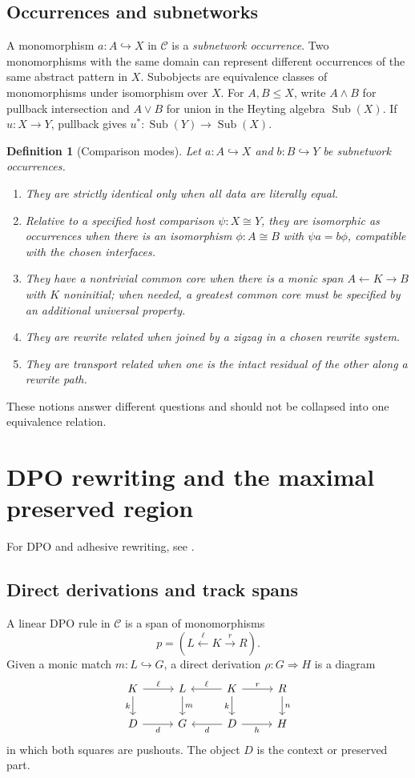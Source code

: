 \documentclass[12pt,a4paper,twoside]{extarticle}
\theoremstyle{compactplain}
\theoremstyle{compactdef}
\newtheorem{definition}[theorem]{Definition}
\newcommand{\Sub}{\operatorname{Sub}}
\newcommand{\iso}{\cong}
\newcommand{\mono}{\hookrightarrow}
\begin{document}
\subsection{Occurrences and subnetworks}
A monomorphism $a:A\mono X$ in $\mathcal C$ is a \emph{subnetwork occurrence}. Two monomorphisms with the same domain can represent different occurrences of the same abstract pattern in $X$. Subobjects are equivalence classes of monomorphisms under isomorphism over $X$. For $A,B\le X$, write $A\wedge B$ for pullback intersection and $A\vee B$ for union in the Heyting algebra $\Sub(X)$. If $u:X\to Y$, pullback gives $u^*:\Sub(Y)\to\Sub(X)$.

\begin{definition}[Comparison modes]
Let $a:A\mono X$ and $b:B\mono Y$ be subnetwork occurrences.
\begin{enumerate}
\item They are strictly identical only when all data are literally equal.
\item Relative to a specified host comparison $\psi:X\iso Y$, they are isomorphic as occurrences when there is an isomorphism $\phi:A\iso B$ with $\psi a=b\phi$, compatible with the chosen interfaces.
\item They have a nontrivial common core when there is a monic span $A\leftarrow K\rightarrow B$ with $K$ noninitial; when needed, a greatest common core must be specified by an additional universal property.
\item They are rewrite related when joined by a zigzag in a chosen rewrite system.
\item They are transport related when one is the intact residual of the other along a rewrite path.
\end{enumerate}
\end{definition}
These notions answer different questions and should not be collapsed into one equivalence relation.
\section{DPO rewriting and the maximal preserved region}
For DPO and adhesive rewriting, see \cite{lack-sobocinski,behr-harmer-krivine,zanasi-free-hypergraph,bonchi-rewriting-frobenius}.

\subsection{Direct derivations and track spans}
A linear DPO rule in $\mathcal C$ is a span of monomorphisms
\[
p=(L\xleftarrow{\ell}K\xrightarrow{r}R).
\]
Given a monic match $m:L\mono G$, a direct derivation $\rho:G\Rightarrow H$ is a diagram
\[
\begin{tikzcd}[column sep=2.7em,row sep=1.7em]
K \arrow[r,"\ell"] \arrow[d,"k"'] & L \arrow[d,"m"] & K \arrow[l,"\ell"'] \arrow[r,"r"] \arrow[d,"k"'] & R \arrow[d,"n"]\\
D \arrow[r,"d"'] & G & D \arrow[l,"d"] \arrow[r,"h"'] & H
\end{tikzcd}
\]
in which both squares are pushouts. The object $D$ is the context or preserved part.
\end{document}
